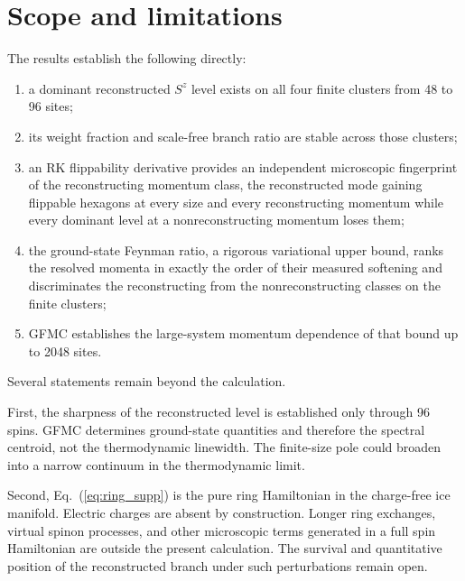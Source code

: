 \documentclass[
aps,
prl,
onecolumn,
amsmath,
amssymb,
superscriptaddress,
longbibliography
]{revtex4-2}
\begin{document}
\section{Scope and limitations}
\label{sec:limitations}

The results establish the following directly:
\begin{enumerate}
\item
a dominant reconstructed $S^z$ level exists on all four finite
clusters from 48 to 96 sites;

\item
its weight fraction and scale-free branch ratio are stable across
those clusters;

\item
an RK flippability derivative provides an independent microscopic
fingerprint of the reconstructing momentum class, the reconstructed
mode gaining flippable hexagons at every size and every
reconstructing momentum while every dominant level at a
nonreconstructing momentum loses them;

\item
the ground-state Feynman ratio, a rigorous variational upper bound,
ranks the resolved momenta in exactly the order of their measured
softening and discriminates the reconstructing from the
nonreconstructing classes on the finite clusters;

\item
GFMC establishes the large-system momentum dependence of that bound
up to 2048 sites.
\end{enumerate}

Several statements remain beyond the calculation.

First, the sharpness of the reconstructed level is established only
through 96 spins.
GFMC determines ground-state quantities and therefore the spectral
centroid, not the thermodynamic linewidth.
The finite-size pole could broaden into a narrow continuum in the
thermodynamic limit.

Second, Eq.~(\ref{eq:ring_supp}) is the pure ring Hamiltonian in the
charge-free ice manifold.
Electric charges are absent by construction.
Longer ring exchanges, virtual spinon processes, and other microscopic
terms generated in a full spin Hamiltonian are outside the present
calculation.
The survival and quantitative position of the reconstructed branch
under such perturbations remain open.
\end{document}
